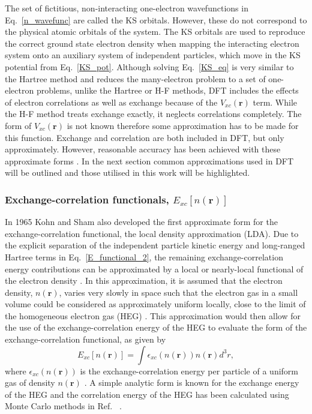 \documentclass[11pt, twoside]{report}
\begin{document}
The set of fictitious, non-interacting one-electron wavefunctions in Eq.~\ref{n_wavefunc} are called the KS orbitals. However, these do not correspond to the physical atomic orbitals of the system. The KS orbitals are used to reproduce the correct ground state electron density when mapping the interacting electron system onto an auxiliary system of independent particles, which move in the KS potential from Eq.~\ref{KS_pot}. Although solving Eq.~\ref{KS_eq} is very similar to the Hartree method and reduces the many-electron problem to a set of one-electron problems, unlike the Hartree or H-F methods, DFT includes the effects of electron correlations as well as exchange because of the $V_{xc}(\boldsymbol{r})$ term. While the H-F method treats exchange exactly, it neglects correlations completely. The form of $V_{xc}(\boldsymbol{r})$ is not known therefore some approximation has to be made for this function. Exchange and correlation are both included in DFT, but only approximately. However, reasonable accuracy has been achieved with these approximate forms \cite{Prasad_ch3}. In the next section common approximations used in DFT will be outlined and those utilised in this work will be highlighted.




\subsubsection{Exchange-correlation functionals, $E_{xc}[n(\boldsymbol{r})]$}
In 1965 Kohn and Sham also developed the first approximate form for the exchange-correlation functional, the local density approximation (LDA). Due to the explicit separation of the independent particle kinetic energy and long-ranged Hartree terms in Eq.~\ref{E_functional_2}, the remaining exchange-correlation energy contributions can be approximated by a local or nearly-local functional of the electron density \cite{RichardMartin_Ch7}. In this approximation, it is assumed that the electron density, $n(\boldsymbol{r})$, varies very slowly in space such that the electron gas in a small volume could be considered as approximately uniform locally, close to the limit of the homogeneous electron gas (HEG) \cite{RichardMartin_Ch8}. This approximation would then allow for the use of the exchange-correlation energy of the HEG to evaluate the form of the exchange-correlation functional, as given by
\begin{equation}\label{LDA_E_func}
E_{xc}[n(\boldsymbol{r})] = \int \epsilon_{xc}(n(\boldsymbol{r}))n(\boldsymbol{r})d^3r,
\end{equation}
where $\epsilon_{xc}(n(\boldsymbol{r}))$ is the exchange-correlation energy per particle of a uniform gas of density $n(\boldsymbol{r})$ \cite{Prasad_ch3}. A simple analytic form is known for the exchange energy of the HEG and the correlation energy of the HEG has been calculated using Monte Carlo methods in Ref.~ \cite{RichardMartin_Ch8}.
\end{document}
